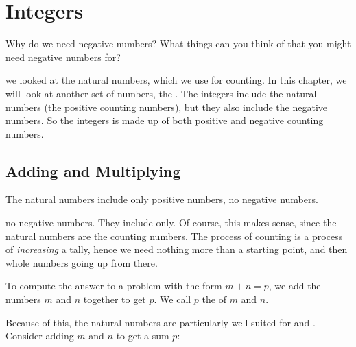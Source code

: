 \documentclass[../../../main.tex]{subfiles}
\begin{document}
\chapter{Integers}
\label{ch:the-integers}

\begin{ponder}
  Why do we need negative numbers? What things can you think of that you might need negative numbers for?
\end{ponder}

 we looked at the natural numbers, which we use for counting. In this chapter, we will look at another set of numbers, the . The integers include the natural numbers (the positive counting numbers), but they also include the negative numbers. So the integers is made up of both positive and negative counting numbers.


\section{Adding and Multiplying}

\begin{aside}
  \begin{remark}
    The natural numbers include only positive numbers, no negative numbers.
  \end{remark}
\end{aside}

 no negative numbers. They include  only. Of course, this makes sense, since the natural numbers are the counting numbers. The process of counting is a process of \emph{increasing} a tally, hence we need nothing more than a starting point, and then whole numbers going up from there.

\begin{terminology}
  To compute the answer to a problem with the form $m + n = p$, we add the numbers $m$ and $n$ together to get $p$. We call $p$ the  of $m$ and $n$.
\end{terminology}

Because of this, the natural numbers are particularly well suited for  and . Consider adding $m$ and $n$ to get a sum $p$:
\end{document}
